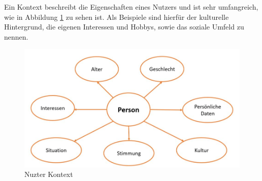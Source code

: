 Ein Kontext beschreibt die Eigenschaften eines Nutzers und ist sehr umfangreich, wie in Abbildung \ref{fig:kontext} zu sehen ist. Als Beispiele sind hierfür der kulturelle Hintergrund, die eigenen Interessen und Hobbys, sowie das soziale Umfeld zu nennen.

\begin{figure}[!h]
	\centering
	\includegraphics[width=1\linewidth]{Picture/Kontext}
	\caption[Nuzter Kontext]{Nuzter Kontext}
	\label{fig:kontext}
\end{figure}





